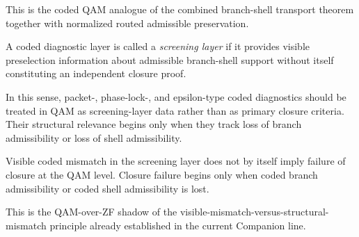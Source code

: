 \begin{remark}
This is the coded QAM analogue of the combined branch-shell transport theorem together with normalized routed admissible preservation.
\end{remark}

\begin{definition}
A coded diagnostic layer is called a \emph{screening layer} if it provides visible preselection information about admissible branch-shell support without itself constituting an independent closure proof.
\end{definition}

\begin{remark}
In this sense, packet-, phase-lock-, and epsilon-type coded diagnostics should be treated in QAM as screening-layer data rather than as primary closure criteria. Their structural relevance begins only when they track loss of branch admissibility or loss of shell admissibility.
\end{remark}

\begin{corollary}\label{cor:qam-visible-structural}
Visible coded mismatch in the screening layer does not by itself imply failure of closure at the QAM level. Closure failure begins only when coded branch admissibility or coded shell admissibility is lost.
\end{corollary}

\begin{remark}
This is the QAM-over-ZF shadow of the visible-mismatch-versus-structural-mismatch principle already established in the current Companion line.
\end{remark}


